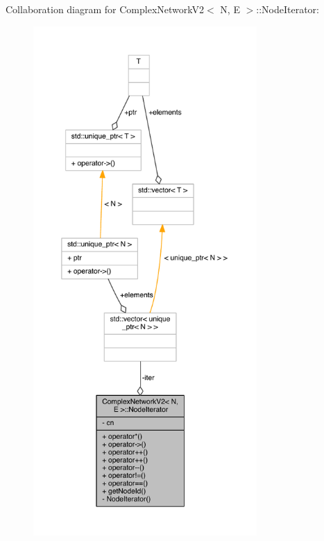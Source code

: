 Collaboration diagram for Complex\+Network\+V2$<$ N, E $>$\+:\+:Node\+Iterator\+:
\nopagebreak
\begin{figure}[H]
\begin{center}
\leavevmode
\includegraphics[height=550pt]{class_complex_network_v2_1_1_node_iterator__coll__graph}
\end{center}
\end{figure}


